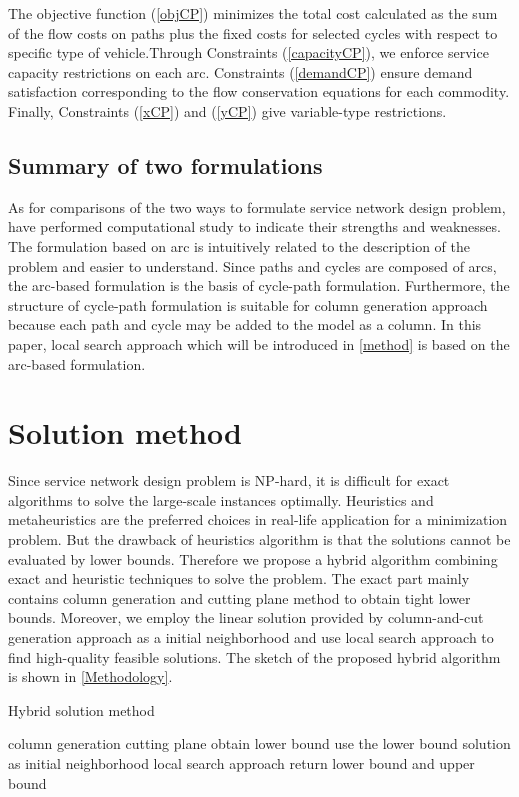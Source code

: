 \documentclass[11pt,nonblindrev,fleqn]{article}
\begin{document}
The objective function (\ref{objCP}) minimizes the total cost calculated as the sum of the flow costs on paths plus the fixed costs for selected cycles with respect to specific type of vehicle.Through Constraints (\ref{capacityCP}), we enforce service capacity restrictions on each arc. Constraints (\ref{demandCP}) ensure demand satisfaction corresponding to the flow conservation equations for each commodity. Finally, Constraints (\ref{xCP}) and (\ref{yCP}) give variable-type restrictions.

\subsection{Summary of two formulations}
As for comparisons of the two ways to formulate service network design problem, \cite{Andersen2009bService} have performed computational study to indicate their strengths and weaknesses. The formulation based on arc is intuitively related to the description of the problem and easier to understand. Since paths and cycles are composed of arcs, the arc-based formulation is the basis of cycle-path formulation. Furthermore, the structure of cycle-path formulation is suitable for column generation approach because each path and cycle may be added to the model as a column. In this paper, local search approach which will be introduced in \autoref{method} is based on the arc-based formulation.

\section{Solution method}\label{method}
Since service network design problem is NP-hard, it is difficult for exact algorithms to solve the large-scale instances optimally. Heuristics and metaheuristics are the preferred choices in real-life application for a minimization problem. But the drawback of heuristics algorithm is that the solutions cannot be evaluated by lower bounds. Therefore we propose a hybrid algorithm combining exact and heuristic techniques to solve the problem. The exact part mainly contains column generation and cutting plane method to obtain tight lower bounds. Moreover, we employ the linear solution provided by column-and-cut generation approach as a initial neighborhood and use local search approach to find high-quality feasible solutions. The sketch of the proposed hybrid algorithm is shown in \autoref{Methodology}.

\vspace{.15in}
\begin{algorithm}[H]
\caption{Hybrid solution method}\label{Methodology}
\LinesNumbered
\SetNlSkip{1.2em}
{
    column generation\;
    cutting plane\;
}
obtain lower bound\;
use the lower bound solution as initial neighborhood\;
local search approach\;
return lower bound and upper bound\;
\end{algorithm}
\end{document}
